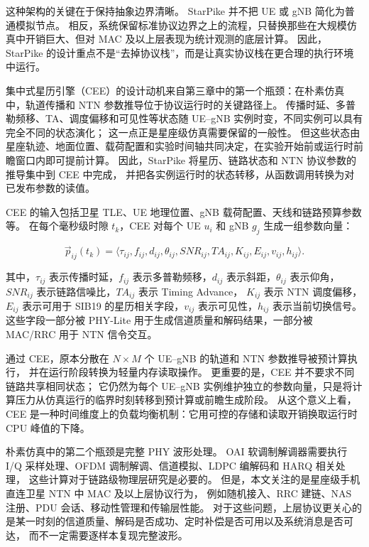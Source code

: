 这种架构的关键在于保持抽象边界清晰。
StarPike 并不把 UE 或 gNB 简化为普通模拟节点。
相反，系统保留标准协议边界之上的流程，只替换那些在大规模仿真中开销巨大、但对 MAC 及以上层表现为统计观测的底层计算。
因此，StarPike 的设计重点不是“去掉协议栈”，而是让真实协议栈在更合理的执行环境中运行。


集中式星历引擎（CEE）的设计动机来自第三章中的第一个瓶颈：在朴素仿真中，轨道传播和 NTN 参数推导位于协议运行时的关键路径上。
传播时延、多普勒频移、TA、调度偏移和可见性等状态随 UE--gNB 实例时变，不同实例可以具有完全不同的状态演化；
这一点正是星座级仿真需要保留的一般性。
但这些状态由星座轨迹、地面位置、载荷配置和实验时间轴共同决定，在实验开始前或运行时前瞻窗口内即可提前计算。
因此，StarPike 将星历、链路状态和 NTN 协议参数的推导集中到 CEE 中完成，
并把各实例运行时的状态转移，从函数调用转换为对已发布参数的读值。

CEE 的输入包括卫星 TLE、UE 地理位置、gNB 载荷配置、天线和链路预算参数等。
在每个毫秒级时隙 $t_k$，CEE 对每个 UE $u_i$ 和 gNB $g_j$ 生成一组参数向量：

\begin{equation}\label{cee_parameter_vector}
\vec{p}_{ij}(t_k)=\langle \tau_{ij}, f_{ij}, d_{ij}, \theta_{ij}, SNR_{ij}, TA_{ij}, K_{ij}, E_{ij}, v_{ij}, h_{ij} \rangle .
\end{equation}

其中，$\tau_{ij}$ 表示传播时延，$f_{ij}$ 表示多普勒频移，$d_{ij}$ 表示斜距，$\theta_{ij}$ 表示仰角，
$SNR_{ij}$ 表示链路信噪比，$TA_{ij}$ 表示 Timing Advance，
$K_{ij}$ 表示 NTN 调度偏移，$E_{ij}$ 表示可用于 SIB19 的星历相关字段，$v_{ij}$ 表示可见性，$h_{ij}$ 表示当前切换信号。
这些字段一部分被 PHY-Lite 用于生成信道质量和解码结果，一部分被 MAC/RRC 用于 NTN 信令交互。

通过 CEE，原本分散在 $N\times M$ 个 UE--gNB 的轨道和 NTN 参数推导被预计算执行，
并在运行阶段转换为轻量内存读取操作。
更重要的是，CEE 并不要求不同链路共享相同状态；
它仍然为每个 UE--gNB 实例维护独立的参数向量，只是将计算压力从仿真运行的临界时刻转移到预计算或前瞻生成阶段。
从这个意义上看，CEE 是一种时间维度上的负载均衡机制：它用可控的存储和读取开销换取运行时 CPU 峰值的下降。


朴素仿真中的第二个瓶颈是完整 PHY 波形处理。
OAI 软调制解调器需要执行 I/Q 采样处理、OFDM 调制解调、信道模拟、LDPC 编解码和 HARQ 相关处理，
这些计算对于链路级物理层研究是必要的。
但是，本文关注的是星座级手机直连卫星 NTN 中 MAC 及以上层协议行为，
例如随机接入、RRC 建链、NAS 注册、PDU 会话、移动性管理和传输层性能。
对于这些问题，上层协议更关心的是某一时刻的信道质量、解码是否成功、定时补偿是否可用以及系统消息是否可达，
而不一定需要逐样本复现完整波形。

